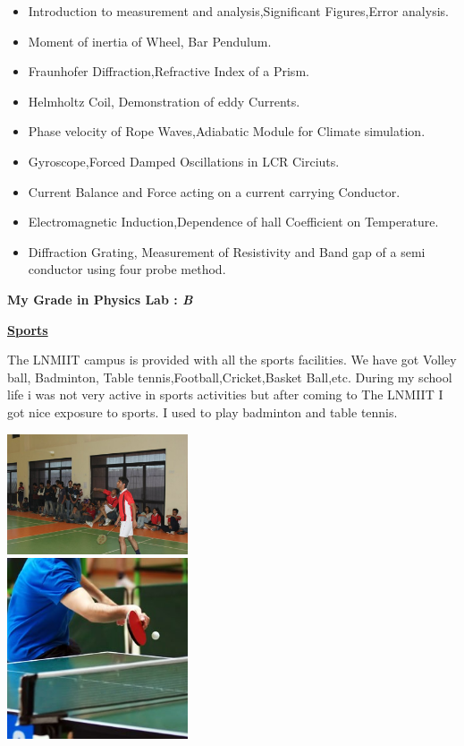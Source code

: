 \documentclass{report}
\begin{document}
\begin{itemize}
\item Introduction to measurement and analysis,Significant Figures,Error analysis.
\item Moment of inertia of Wheel, Bar Pendulum.
\item Fraunhofer Diffraction,Refractive Index of a Prism.
\item Helmholtz Coil, Demonstration of eddy Currents.
\item Phase velocity of Rope Waves,Adiabatic Module for Climate simulation.
\item Gyroscope,Forced Damped Oscillations in LCR Circiuts.
\item Current Balance and Force acting on a current carrying Conductor.
\item Electromagnetic Induction,Dependence of hall Coefficient on Temperature.
\item Diffraction Grating, Measurement of Resistivity and Band gap of a semi conductor using four probe method.
\end{itemize}
\Large{\bf My Grade in Physics Lab : \emph{B}}
\pagebreak
\begin{center}\huge{\bf \underline{Sports}}\end{center}
\vspace{1in}
\hspace{.5in} The LNMIIT campus is provided with all the sports facilities. We have got Volley ball, Badminton, Table tennis,Football,Cricket,Basket Ball,etc. During my school life i was not very active in sports activities but after coming to The LNMIIT I got nice exposure to sports. I used to play badminton and table tennis.
\vspace{.5in}
\begin{center}
\includegraphics [width=0.40\textwidth]{baddy.jpg}\vspace{.5in}\\
\includegraphics [width=0.40\textwidth]{tt.jpg}
\end{center}
\end{document}

